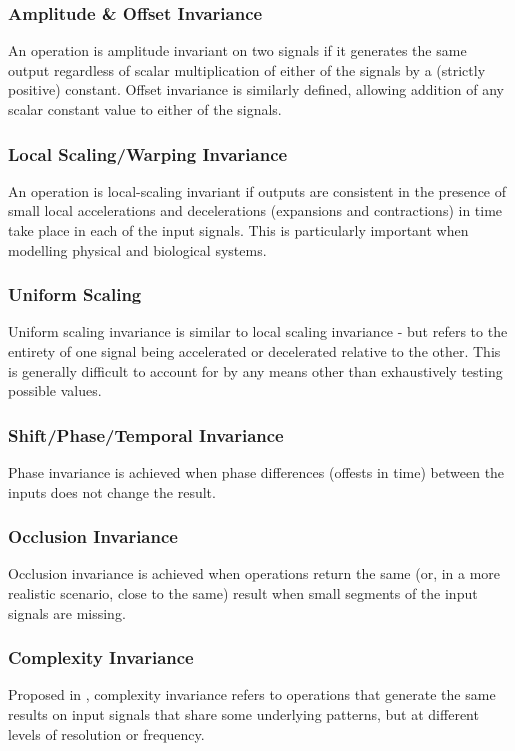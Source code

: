 \documentclass[9pt,conference]{IEEEtran}
\begin{document}
\subsubsection{Amplitude \& Offset Invariance} An operation is amplitude invariant on two signals if it generates the same output regardless of scalar multiplication of either of the signals by a (strictly positive) constant. Offset invariance is similarly defined, allowing addition of any scalar constant value to either of the signals.
\subsubsection{Local Scaling/Warping Invariance} An operation is local-scaling invariant if outputs are consistent in the presence of small local accelerations and decelerations (expansions and contractions) in time take place in each of the input signals. This is particularly important when modelling physical and biological systems. 
\subsubsection{Uniform Scaling} Uniform scaling invariance is similar to local scaling invariance - but refers to the entirety of one signal being accelerated or decelerated relative to the other. This is generally difficult to account for by any means other than exhaustively testing possible values.
\subsubsection{Shift/Phase/Temporal Invariance} Phase invariance is achieved when phase differences (offests in time) between the inputs does not change the result.
\subsubsection{Occlusion Invariance} Occlusion invariance is achieved when operations return the same (or, in a more realistic scenario, close to the same) result when small segments of the input signals are missing.
\subsubsection{Complexity Invariance} Proposed in \cite{batista2014cid}, complexity invariance refers to operations that generate the same results on input signals that share some underlying patterns, but at different levels of resolution or frequency.
\end{document}
